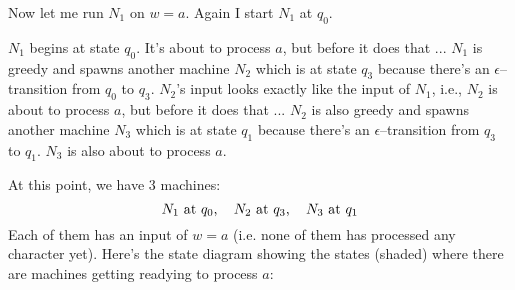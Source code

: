 Now let me run $N_1$ on $w = a$. Again I start $N_1$ at $q_0$.
\begin{enumerate}
  \li $N_1$ begins at state $q_0$. It's about to process $a$,
  but before it does that ...
  \li $N_1$ is greedy and spawns another machine $N_2$ which is at state $q_3$
  because there's an $\epsilon$--transition from $q_0$ to $q_3$.
    $N_2$'s input looks exactly like the input of $N_1$, i.e., 
    $N_2$ is about to process $a$, but before it does that ...
  \li $N_2$ is also greedy and spawns another machine $N_3$ which is at state 
  $q_1$ because there's an $\epsilon$--transition from
  $q_3$ to $q_1$. $N_3$ is also about to process $a$.
\end{enumerate}
At this point, we have 3 machines:
\[
\text{$N_1$ at $q_0$, \,\,\, $N_2$ at $q_3$, \,\,\, $N_3$ at $q_1$}
\]
Each of them has an input of $w = a$ 
(i.e. none of them has processed any character yet).
Here's the state diagram showing the states (shaded) where there are machines
getting readying to process $a$:

\begin{center}
\end{center}

